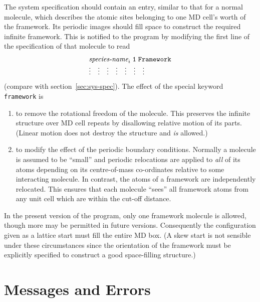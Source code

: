 The system specification should contain an entry, similar to that for
a normal molecule, which describes the atomic sites belonging to one
MD cell's worth of the framework.  Its periodic images should fill
space to construct the required infinite framework.  This is notified
to the program by modifying the first line of the specification of
that molecule to read
\begin{displaymath}
\begin{array}{lllllll}
\multicolumn{7}{l}{\mbox{{\it species-name}}_{i} {\tt \; 1 \; Framework}}  \\
\vdots & \vdots & \vdots & \vdots & \vdots & \vdots & \vdots \\
\end{array}
\end{displaymath}
(compare with section~\ref{sec:sys-spec}).  The effect of the special
keyword \verb'framework' is
\begin{enumerate}
\item to remove the rotational freedom of the molecule.  This
preserves the infinite structure over MD cell repeats by disallowing
relative motion of its parts. (Linear motion does not destroy the
structure and {\em is} allowed.)
\item to modify the effect of the periodic boundary conditions.
Normally a molecule is assumed to be ``small'' and periodic relocations
are applied to {\em all} of its atoms depending on its centre-of-mass
co-ordinates relative to some interacting molecule.  In contrast, the
atoms of a framework are independently relocated.  This ensures that
each molecule ``sees'' all framework atoms from any unit cell which
are within the cut-off distance.
\end{enumerate}

In the present version of the program, only one framework molecule is
allowed, though more may be permitted in future versions. Consequently
the configuration given as a lattice start must fill the entire MD
box. (A skew start is not sensible under these circumstances since the
orientation of the framework must be explicitly specified to construct
a good space-filling structure.)

\section{Messages and Errors}

